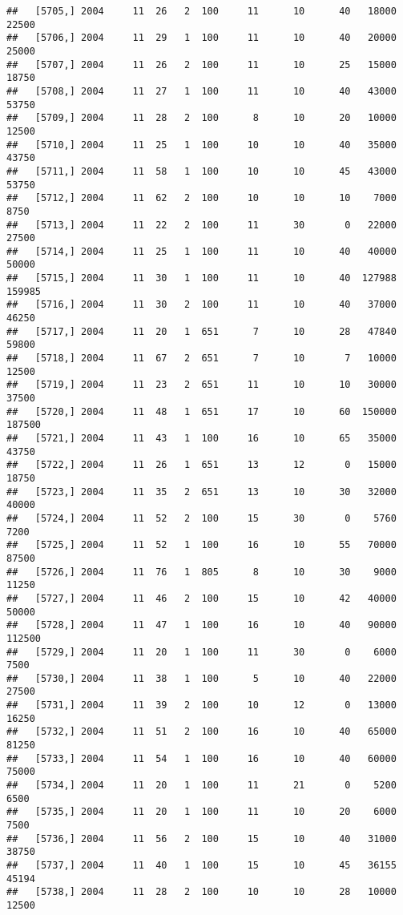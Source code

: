 \documentclass{article}\usepackage[]{graphicx}\usepackage[]{color}
\makeatletter
\newenvironment{kframe}{%
 \def\at@end@of@kframe{}%
 \ifinner\ifhmode%
  \def\at@end@of@kframe{\end{minipage}}%
  \begin{minipage}{\columnwidth}%
 \fi\fi%
 \def\FrameCommand##1{\hskip\@totalleftmargin \hskip-\fboxsep
 \colorbox{shadecolor}{##1}\hskip-\fboxsep
     \hskip-\linewidth \hskip-\@totalleftmargin \hskip\columnwidth}%
 \MakeFramed {\advance\hsize-\width
   \@totalleftmargin\z@ \linewidth\hsize
   \@setminipage}}%
 {\par\unskip\endMakeFramed%
 \at@end@of@kframe}
\newenvironment{knitrout}{}{} %
\makeatother
\begin{document}
\begin{knitrout}
\begin{kframe}
\begin{verbatim}
##   [5705,] 2004     11  26   2  100     11      10      40   18000   22500
##   [5706,] 2004     11  29   1  100     11      10      40   20000   25000
##   [5707,] 2004     11  26   2  100     11      10      25   15000   18750
##   [5708,] 2004     11  27   1  100     11      10      40   43000   53750
##   [5709,] 2004     11  28   2  100      8      10      20   10000   12500
##   [5710,] 2004     11  25   1  100     10      10      40   35000   43750
##   [5711,] 2004     11  58   1  100     10      10      45   43000   53750
##   [5712,] 2004     11  62   2  100     10      10      10    7000    8750
##   [5713,] 2004     11  22   2  100     11      30       0   22000   27500
##   [5714,] 2004     11  25   1  100     11      10      40   40000   50000
##   [5715,] 2004     11  30   1  100     11      10      40  127988  159985
##   [5716,] 2004     11  30   2  100     11      10      40   37000   46250
##   [5717,] 2004     11  20   1  651      7      10      28   47840   59800
##   [5718,] 2004     11  67   2  651      7      10       7   10000   12500
##   [5719,] 2004     11  23   2  651     11      10      10   30000   37500
##   [5720,] 2004     11  48   1  651     17      10      60  150000  187500
##   [5721,] 2004     11  43   1  100     16      10      65   35000   43750
##   [5722,] 2004     11  26   1  651     13      12       0   15000   18750
##   [5723,] 2004     11  35   2  651     13      10      30   32000   40000
##   [5724,] 2004     11  52   2  100     15      30       0    5760    7200
##   [5725,] 2004     11  52   1  100     16      10      55   70000   87500
##   [5726,] 2004     11  76   1  805      8      10      30    9000   11250
##   [5727,] 2004     11  46   2  100     15      10      42   40000   50000
##   [5728,] 2004     11  47   1  100     16      10      40   90000  112500
##   [5729,] 2004     11  20   1  100     11      30       0    6000    7500
##   [5730,] 2004     11  38   1  100      5      10      40   22000   27500
##   [5731,] 2004     11  39   2  100     10      12       0   13000   16250
##   [5732,] 2004     11  51   2  100     16      10      40   65000   81250
##   [5733,] 2004     11  54   1  100     16      10      40   60000   75000
##   [5734,] 2004     11  20   1  100     11      21       0    5200    6500
##   [5735,] 2004     11  20   1  100     11      10      20    6000    7500
##   [5736,] 2004     11  56   2  100     15      10      40   31000   38750
##   [5737,] 2004     11  40   1  100     15      10      45   36155   45194
##   [5738,] 2004     11  28   2  100     10      10      28   10000   12500

\end{verbatim}
\end{kframe}
\end{knitrout}
\end{document}

